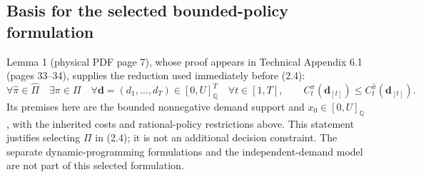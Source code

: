 \documentclass{article}
\begin{document}
\subsection*{Basis for the selected bounded-policy formulation}
Lemma 1 (physical PDF page 7), whose proof appears in Technical Appendix 6.1 (pages 33--34), supplies the reduction used immediately before (2.4):
\[
\forall\hat\pi\in\hat\Pi\quad\exists\pi\in\Pi\quad
\forall\mathbf d=(d_1,\ldots,d_T)\in[0,U]_{\mathbb{Q}}^T\quad
\forall t\in[1,T],\qquad
C_t^\pi(\mathbf d_{[t]})\leq C_t^{\hat\pi}(\mathbf d_{[t]}).
\]
Its premises here are the bounded nonnegative demand support and \(x_0\in[0,U]_{\mathbb{Q}}\), with the inherited costs and rational-policy restrictions above. This statement justifies selecting \(\Pi\) in (2.4); it is not an additional decision constraint. The separate dynamic-programming formulations and the independent-demand model are not part of this selected formulation.
\end{document}
